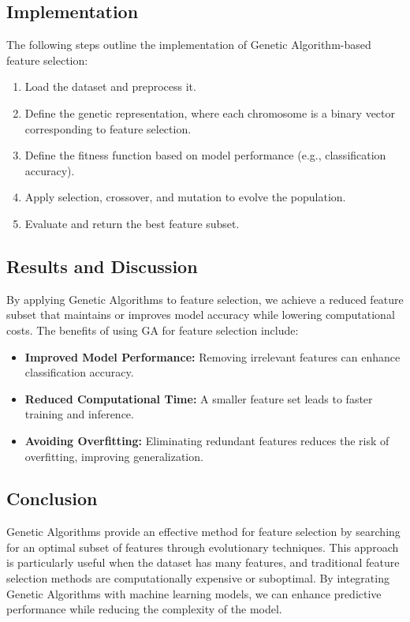 \subsection{Implementation}

The following steps outline the implementation of Genetic Algorithm-based feature selection:

\begin{enumerate}
    \item Load the dataset and preprocess it.
    \item Define the genetic representation, where each chromosome is a binary vector corresponding to feature selection.
    \item Define the fitness function based on model performance (e.g., classification accuracy).
    \item Apply selection, crossover, and mutation to evolve the population.
    \item Evaluate and return the best feature subset.
\end{enumerate}


\subsection{Results and Discussion}

By applying Genetic Algorithms to feature selection, we achieve a reduced feature subset that maintains or improves model accuracy while lowering computational costs. The benefits of using GA for feature selection include:

\begin{itemize}
    \item \textbf{Improved Model Performance:} Removing irrelevant features can enhance classification accuracy.
    \item \textbf{Reduced Computational Time:} A smaller feature set leads to faster training and inference.
    \item \textbf{Avoiding Overfitting:} Eliminating redundant features reduces the risk of overfitting, improving generalization.
\end{itemize}

\subsection{Conclusion}

Genetic Algorithms provide an effective method for feature selection by searching for an optimal subset of features through evolutionary techniques. This approach is particularly useful when the dataset has many features, and traditional feature selection methods are computationally expensive or suboptimal. By integrating Genetic Algorithms with machine learning models, we can enhance predictive performance while reducing the complexity of the model.
